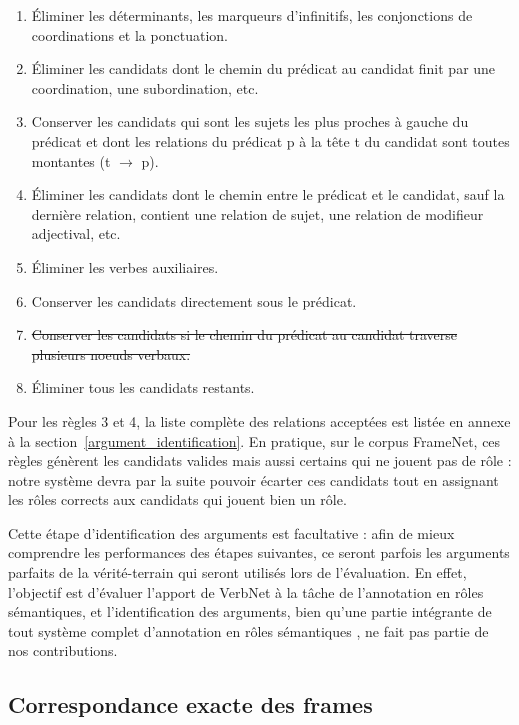 \begin{enumerate}
    \item Éliminer les déterminants, les marqueurs d'infinitifs, les conjonctions de coordinations et la ponctuation.
    \item Éliminer les candidats dont le chemin du prédicat au candidat finit par une coordination, une subordination, etc.
    \item Conserver les candidats qui sont les sujets les plus proches à gauche du prédicat et dont les relations du prédicat p à la tête t du candidat sont toutes montantes (t $\rightarrow$ p).
    \item Éliminer les candidats  dont le chemin entre le prédicat et le candidat, sauf la dernière relation, contient une relation de sujet, une relation de modifieur adjectival, etc.
    \item Éliminer les verbes auxiliaires.
    \item Conserver les candidats directement sous le prédicat.
    \item \sout{Conserver les candidats si le chemin du prédicat au candidat traverse plusieurs noeuds verbaux.}
    \item Éliminer tous les candidats restants.
\end{enumerate}

Pour les règles 3 et 4, la liste complète des relations acceptées est listée en
annexe à la section~\ref{argument_identification}. En pratique, sur le corpus
FrameNet, ces règles génèrent les candidats valides mais aussi certains qui ne
jouent pas de rôle : notre système devra par la suite pouvoir écarter ces
candidats tout en assignant les rôles corrects aux candidats qui jouent bien un
rôle.

Cette étape d'identification des arguments est facultative : afin de mieux
comprendre les performances des étapes suivantes, ce seront parfois les
arguments parfaits de la vérité-terrain qui seront utilisés lors de
l'évaluation. En effet, l'objectif est d'évaluer l'apport de VerbNet à la tâche
de l'annotation en rôles sémantiques, et l'identification des arguments, bien
qu'une partie intégrante de tout système complet d'annotation en rôles
sémantiques \citep{das2010probabilistic}, ne fait pas partie de nos
contributions.

\subsection{Correspondance exacte des frames}

